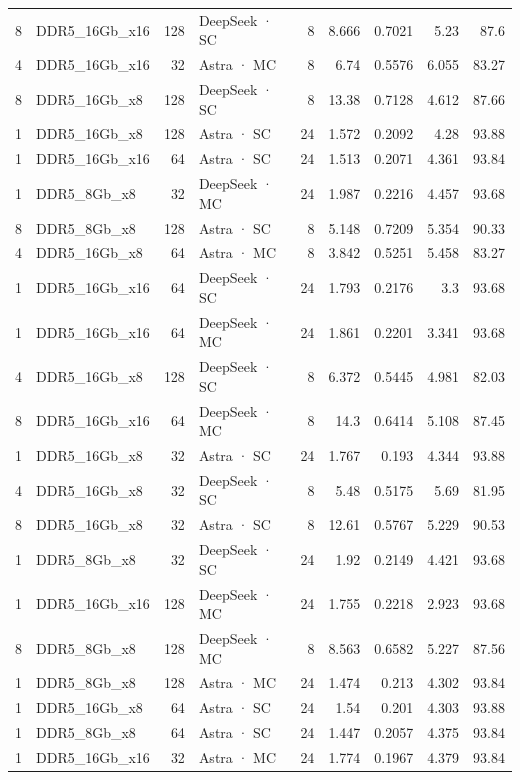 \begin{tabular}{rlrlrrrrr}
8 & DDR5\_16Gb\_x16 & 128 & DeepSeek · SC & 8 & 8.666 & 0.7021 & 5.23 & 87.6 \\
4 & DDR5\_16Gb\_x16 & 32 & Astra · MC & 8 & 6.74 & 0.5576 & 6.055 & 83.27 \\
8 & DDR5\_16Gb\_x8 & 128 & DeepSeek · SC & 8 & 13.38 & 0.7128 & 4.612 & 87.66 \\
1 & DDR5\_16Gb\_x8 & 128 & Astra · SC & 24 & 1.572 & 0.2092 & 4.28 & 93.88 \\
1 & DDR5\_16Gb\_x16 & 64 & Astra · SC & 24 & 1.513 & 0.2071 & 4.361 & 93.84 \\
1 & DDR5\_8Gb\_x8 & 32 & DeepSeek · MC & 24 & 1.987 & 0.2216 & 4.457 & 93.68 \\
8 & DDR5\_8Gb\_x8 & 128 & Astra · SC & 8 & 5.148 & 0.7209 & 5.354 & 90.33 \\
4 & DDR5\_16Gb\_x8 & 64 & Astra · MC & 8 & 3.842 & 0.5251 & 5.458 & 83.27 \\
1 & DDR5\_16Gb\_x16 & 64 & DeepSeek · SC & 24 & 1.793 & 0.2176 & 3.3 & 93.68 \\
1 & DDR5\_16Gb\_x16 & 64 & DeepSeek · MC & 24 & 1.861 & 0.2201 & 3.341 & 93.68 \\
4 & DDR5\_16Gb\_x8 & 128 & DeepSeek · SC & 8 & 6.372 & 0.5445 & 4.981 & 82.03 \\
8 & DDR5\_16Gb\_x16 & 64 & DeepSeek · MC & 8 & 14.3 & 0.6414 & 5.108 & 87.45 \\
1 & DDR5\_16Gb\_x8 & 32 & Astra · SC & 24 & 1.767 & 0.193 & 4.344 & 93.88 \\
4 & DDR5\_16Gb\_x8 & 32 & DeepSeek · SC & 8 & 5.48 & 0.5175 & 5.69 & 81.95 \\
8 & DDR5\_16Gb\_x8 & 32 & Astra · SC & 8 & 12.61 & 0.5767 & 5.229 & 90.53 \\
1 & DDR5\_8Gb\_x8 & 32 & DeepSeek · SC & 24 & 1.92 & 0.2149 & 4.421 & 93.68 \\
1 & DDR5\_16Gb\_x16 & 128 & DeepSeek · MC & 24 & 1.755 & 0.2218 & 2.923 & 93.68 \\
8 & DDR5\_8Gb\_x8 & 128 & DeepSeek · MC & 8 & 8.563 & 0.6582 & 5.227 & 87.56 \\
1 & DDR5\_8Gb\_x8 & 128 & Astra · MC & 24 & 1.474 & 0.213 & 4.302 & 93.84 \\
1 & DDR5\_16Gb\_x8 & 64 & Astra · SC & 24 & 1.54 & 0.201 & 4.303 & 93.88 \\
1 & DDR5\_8Gb\_x8 & 64 & Astra · SC & 24 & 1.447 & 0.2057 & 4.375 & 93.84 \\
1 & DDR5\_16Gb\_x16 & 32 & Astra · MC & 24 & 1.774 & 0.1967 & 4.379 & 93.84 \\

\end{tabular}
